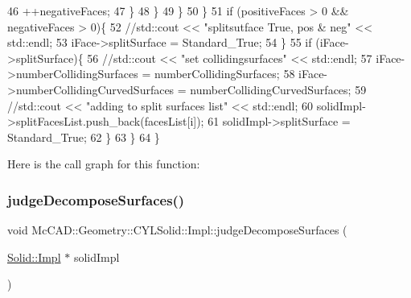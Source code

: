 \begin{DoxyCode}
46                         ++negativeFaces;
47                     \}
48                 \}
49             \}
50         \}
51         \textcolor{keywordflow}{if} (positiveFaces > 0 && negativeFaces > 0)\{
52             \textcolor{comment}{//std::cout << "splitsutface True, pos & neg" << std::endl;}
53             iFace->splitSurface = Standard\_True;
54         \}
55         \textcolor{keywordflow}{if} (iFace->splitSurface)\{
56             \textcolor{comment}{//std::cout << "set collidingsurfaces" << std::endl;}
57             iFace->numberCollidingSurfaces = numberCollidingSurfaces;
58             iFace->numberCollidingCurvedSurfaces = numberCollidingCurvedSurfaces;
59             \textcolor{comment}{//std::cout << "adding to split surfaces list" << std::endl;}
60             solidImpl->splitFacesList.push\_back(facesList[i]);
61             solidImpl->splitSurface = Standard\_True;
62         \}
63     \}
64 \}
\end{DoxyCode}
Here is the call graph for this function\+:
\mbox{\label{classMcCAD_1_1Geometry_1_1CYLSolid_1_1Impl_adbcf36fa6cdfd03153b9cabf1b533691}} 
\subsubsection{\texorpdfstring{judge\+Decompose\+Surfaces()}{judgeDecomposeSurfaces()}\hspace{0.1cm}{\footnotesize\ttfamily [2/2]}}
{\footnotesize\ttfamily void Mc\+C\+A\+D\+::\+Geometry\+::\+C\+Y\+L\+Solid\+::\+Impl\+::judge\+Decompose\+Surfaces (\begin{DoxyParamCaption}\item[{\hyperlink{classMcCAD_1_1Geometry_1_1Solid_1_1Impl}{Solid\+::\+Impl} $\ast$}]{solid\+Impl }\end{DoxyParamCaption})}

\mbox{\label{classMcCAD_1_1Geometry_1_1CYLSolid_1_1Impl_a175966ac5e1a3e4f65b78dc22ee34677}} 
